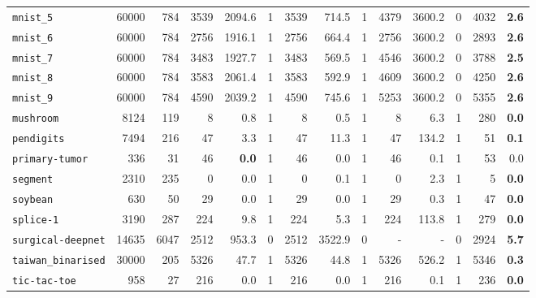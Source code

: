 \begin{tabular}{lccrrrrrrrrrrr}
\texttt{mnist\_5} & \multicolumn{1}{r}{60000} & \multicolumn{1}{r}{784}  & 3539 & 2094.6 & 1 & 3539 & 714.5 & 1 & 4379 & 3600.2 & 0 & 4032 & \textbf{2.6}\\
\texttt{mnist\_6} & \multicolumn{1}{r}{60000} & \multicolumn{1}{r}{784}  & 2756 & 1916.1 & 1 & 2756 & 664.4 & 1 & 2756 & 3600.2 & 0 & 2893 & \textbf{2.6}\\
\texttt{mnist\_7} & \multicolumn{1}{r}{60000} & \multicolumn{1}{r}{784}  & 3483 & 1927.7 & 1 & 3483 & 569.5 & 1 & 4546 & 3600.2 & 0 & 3788 & \textbf{2.5}\\
\texttt{mnist\_8} & \multicolumn{1}{r}{60000} & \multicolumn{1}{r}{784}  & 3583 & 2061.4 & 1 & 3583 & 592.9 & 1 & 4609 & 3600.2 & 0 & 4250 & \textbf{2.6}\\
\texttt{mnist\_9} & \multicolumn{1}{r}{60000} & \multicolumn{1}{r}{784}  & 4590 & 2039.2 & 1 & 4590 & 745.6 & 1 & 5253 & 3600.2 & 0 & 5355 & \textbf{2.6}\\
\texttt{mushroom} & \multicolumn{1}{r}{8124} & \multicolumn{1}{r}{119}  & 8 & 0.8 & 1 & 8 & 0.5 & 1 & 8 & 6.3 & 1 & 280 & \textbf{0.0}\\
\texttt{pendigits} & \multicolumn{1}{r}{7494} & \multicolumn{1}{r}{216}  & 47 & 3.3 & 1 & 47 & 11.3 & 1 & 47 & 134.2 & 1 & 51 & \textbf{0.1}\\
\texttt{primary-tumor} & \multicolumn{1}{r}{336} & \multicolumn{1}{r}{31}  & 46 & \textbf{0.0} & 1 & 46 & 0.0 & 1 & 46 & 0.1 & 1 & 53 & 0.0\\
\texttt{segment} & \multicolumn{1}{r}{2310} & \multicolumn{1}{r}{235}  & 0 & 0.0 & 1 & 0 & 0.1 & 1 & 0 & 2.3 & 1 & 5 & \textbf{0.0}\\
\texttt{soybean} & \multicolumn{1}{r}{630} & \multicolumn{1}{r}{50}  & 29 & 0.0 & 1 & 29 & 0.0 & 1 & 29 & 0.3 & 1 & 47 & \textbf{0.0}\\
\texttt{splice-1} & \multicolumn{1}{r}{3190} & \multicolumn{1}{r}{287}  & 224 & 9.8 & 1 & 224 & 5.3 & 1 & 224 & 113.8 & 1 & 279 & \textbf{0.0}\\
\texttt{surgical-deepnet} & \multicolumn{1}{r}{14635} & \multicolumn{1}{r}{6047}  & 2512 & 953.3 & 0 & 2512 & 3522.9 & 0 & - & - & 0 & 2924 & \textbf{5.7}\\
\texttt{taiwan\_binarised} & \multicolumn{1}{r}{30000} & \multicolumn{1}{r}{205}  & 5326 & 47.7 & 1 & 5326 & 44.8 & 1 & 5326 & 526.2 & 1 & 5346 & \textbf{0.3}\\
\texttt{tic-tac-toe} & \multicolumn{1}{r}{958} & \multicolumn{1}{r}{27}  & 216 & 0.0 & 1 & 216 & 0.0 & 1 & 216 & 0.1 & 1 & 236 & \textbf{0.0}\\

\end{tabular}
